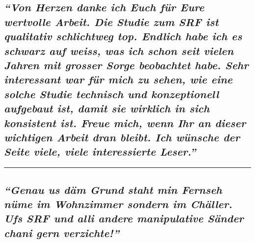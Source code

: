 \hypertarget{von-herzen-danke-ich-euch-fuxfcr-eure-wertvolle-arbeit-die-studie-zum-srf-ist-qualitativ-schlichtweg-top-endlich-habe-ich-es-schwarz-auf-weiss-was-ich-schon-seit-vielen-jahren-mit-grosser-sorge-beobachtet-habe-sehr-interessant-war-fuxfcr-mich-zu-sehen-wie-eine-solche-studie-technisch-und-konzeptionell-aufgebaut-ist-damit-sie-wirklich-in-sich-konsistent-ist-freue-mich-wenn-ihr-an-dieser-wichtigen-arbeit-dran-bleibt-ich-wuxfcnsche-der-seite-viele-viele-interessierte-leser}{%
\subsection{\texorpdfstring{\emph{``Von Herzen danke ich Euch für Eure
wertvolle Arbeit. Die Studie zum SRF ist qualitativ schlichtweg top.
Endlich habe ich es schwarz auf weiss, was ich schon seit vielen Jahren
mit grosser Sorge beobachtet habe. Sehr interessant war für mich zu
sehen, wie eine solche Studie technisch und konzeptionell aufgebaut ist,
damit sie wirklich in sich konsistent ist. Freue mich, wenn Ihr an
dieser wichtigen Arbeit dran bleibt. Ich wünsche der Seite viele, viele
interessierte
Leser.''}}{``Von Herzen danke ich Euch für Eure wertvolle Arbeit. Die Studie zum SRF ist qualitativ schlichtweg top. Endlich habe ich es schwarz auf weiss, was ich schon seit vielen Jahren mit grosser Sorge beobachtet habe. Sehr interessant war für mich zu sehen, wie eine solche Studie technisch und konzeptionell aufgebaut ist, damit sie wirklich in sich konsistent ist. Freue mich, wenn Ihr an dieser wichtigen Arbeit dran bleibt. Ich wünsche der Seite viele, viele interessierte Leser.''}}\label{von-herzen-danke-ich-euch-fuxfcr-eure-wertvolle-arbeit-die-studie-zum-srf-ist-qualitativ-schlichtweg-top-endlich-habe-ich-es-schwarz-auf-weiss-was-ich-schon-seit-vielen-jahren-mit-grosser-sorge-beobachtet-habe-sehr-interessant-war-fuxfcr-mich-zu-sehen-wie-eine-solche-studie-technisch-und-konzeptionell-aufgebaut-ist-damit-sie-wirklich-in-sich-konsistent-ist-freue-mich-wenn-ihr-an-dieser-wichtigen-arbeit-dran-bleibt-ich-wuxfcnsche-der-seite-viele-viele-interessierte-leser}}

\begin{center}\rule{0.5\linewidth}{\linethickness}\end{center}

\hypertarget{genau-us-duxe4m-grund-staht-min-fernseh-nuxfcme-im-wohnzimmer-sondern-im-chuxe4ller-ufs-srf-und-alli-andere-manipulative-suxe4nder-chani-gern-verzichte}{%
\subsection{\texorpdfstring{\emph{``Genau us däm Grund staht min Fernseh
nüme im Wohnzimmer sondern im Chäller. Ufs SRF und alli andere
manipulative Sänder chani gern
verzichte!''}}{``Genau us däm Grund staht min Fernseh nüme im Wohnzimmer sondern im Chäller. Ufs SRF und alli andere manipulative Sänder chani gern verzichte!''}}\label{genau-us-duxe4m-grund-staht-min-fernseh-nuxfcme-im-wohnzimmer-sondern-im-chuxe4ller-ufs-srf-und-alli-andere-manipulative-suxe4nder-chani-gern-verzichte}}

